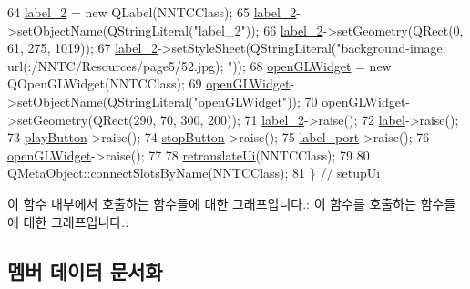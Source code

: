\begin{DoxyCode}
64         \mbox{\hyperlink{class_ui___n_n_t_c_class_ae5ebb132466c86f325d6030871f57b5c}{label\_2}} = \textcolor{keyword}{new} QLabel(NNTCClass);
65         \mbox{\hyperlink{class_ui___n_n_t_c_class_ae5ebb132466c86f325d6030871f57b5c}{label\_2}}->setObjectName(QStringLiteral(\textcolor{stringliteral}{"label\_2"}));
66         \mbox{\hyperlink{class_ui___n_n_t_c_class_ae5ebb132466c86f325d6030871f57b5c}{label\_2}}->setGeometry(QRect(0, 61, 275, 1019));
67         \mbox{\hyperlink{class_ui___n_n_t_c_class_ae5ebb132466c86f325d6030871f57b5c}{label\_2}}->setStyleSheet(QStringLiteral(\textcolor{stringliteral}{"background-image: url(:/NNTC/Resources/page5/52.jpg);
      "}));
68         \mbox{\hyperlink{class_ui___n_n_t_c_class_a6c33153ad1f40f7f704a54888abfd037}{openGLWidget}} = \textcolor{keyword}{new} QOpenGLWidget(NNTCClass);
69         \mbox{\hyperlink{class_ui___n_n_t_c_class_a6c33153ad1f40f7f704a54888abfd037}{openGLWidget}}->setObjectName(QStringLiteral(\textcolor{stringliteral}{"openGLWidget"}));
70         \mbox{\hyperlink{class_ui___n_n_t_c_class_a6c33153ad1f40f7f704a54888abfd037}{openGLWidget}}->setGeometry(QRect(290, 70, 300, 200));
71         \mbox{\hyperlink{class_ui___n_n_t_c_class_ae5ebb132466c86f325d6030871f57b5c}{label\_2}}->raise();
72         \mbox{\hyperlink{class_ui___n_n_t_c_class_a4bb97de507bbb57b6d45f102b06a868f}{label}}->raise();
73         \mbox{\hyperlink{class_ui___n_n_t_c_class_a6e604f467f5d7264f8d23f0cf54a6fdf}{playButton}}->raise();
74         \mbox{\hyperlink{class_ui___n_n_t_c_class_a748e190a62458531e66a574cc556e32d}{stopButton}}->raise();
75         \mbox{\hyperlink{class_ui___n_n_t_c_class_a81085bd25c14084fdec83b6527ad7a4c}{label\_port}}->raise();
76         \mbox{\hyperlink{class_ui___n_n_t_c_class_a6c33153ad1f40f7f704a54888abfd037}{openGLWidget}}->raise();
77 
78         \mbox{\hyperlink{class_ui___n_n_t_c_class_ad2695a3333b66339fde691ec8384d154}{retranslateUi}}(NNTCClass);
79 
80         QMetaObject::connectSlotsByName(NNTCClass);
81     \} \textcolor{comment}{// setupUi}
\end{DoxyCode}
이 함수 내부에서 호출하는 함수들에 대한 그래프입니다.\+:
이 함수를 호출하는 함수들에 대한 그래프입니다.\+:


\subsection{멤버 데이터 문서화}
\mbox{\label{class_ui___n_n_t_c_class_a4bb97de507bbb57b6d45f102b06a868f}} 
